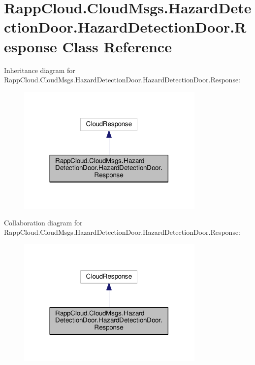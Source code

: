 \hypertarget{classRappCloud_1_1CloudMsgs_1_1HazardDetectionDoor_1_1HazardDetectionDoor_1_1Response}{\section{Rapp\-Cloud.\-Cloud\-Msgs.\-Hazard\-Detection\-Door.\-Hazard\-Detection\-Door.\-Response Class Reference}
\label{classRappCloud_1_1CloudMsgs_1_1HazardDetectionDoor_1_1HazardDetectionDoor_1_1Response}
}


Inheritance diagram for Rapp\-Cloud.\-Cloud\-Msgs.\-Hazard\-Detection\-Door.\-Hazard\-Detection\-Door.\-Response\-:
\nopagebreak
\begin{figure}[H]
\begin{center}
\leavevmode
\includegraphics[width=260pt]{classRappCloud_1_1CloudMsgs_1_1HazardDetectionDoor_1_1HazardDetectionDoor_1_1Response__inherit__graph}
\end{center}
\end{figure}


Collaboration diagram for Rapp\-Cloud.\-Cloud\-Msgs.\-Hazard\-Detection\-Door.\-Hazard\-Detection\-Door.\-Response\-:
\nopagebreak
\begin{figure}[H]
\begin{center}
\leavevmode
\includegraphics[width=260pt]{classRappCloud_1_1CloudMsgs_1_1HazardDetectionDoor_1_1HazardDetectionDoor_1_1Response__coll__graph}
\end{center}
\end{figure}
